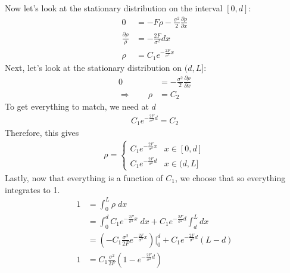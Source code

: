 \documentclass[12pt]{article}
\theoremstyle{plain}
\theoremstyle{definition}
\theoremstyle{remark}
\begin{document}
\begin{enumerate}
\begin{enumerate}
        Now let's look at the stationary distribution on the interval
        $[0,d]$:
        \begin{align*}
          0 &= -F \rho - \frac{\sigma^2}{2} \frac{\partial \rho}{\partial x}\\
          \frac{\partial \rho}{\rho } &= -\frac{2F }{\sigma^2} dx \\
          \rho &= C_1e^{-\frac{2F }{\sigma^2} x}
        \end{align*}
        Next, let's look at the stationary distribution on $(d,L]$:
        \begin{align*}
          0 &= - \frac{\sigma^2}{2} \frac{\partial \rho}{\partial x}\\
          \Rightarrow
          \qquad
          \rho &= C_2
        \end{align*}
        To get everything to match, we need at $d$
        \begin{align*}
          C_1e^{-\frac{2F }{\sigma^2} d} = C_2
        \end{align*}
        Therefore, this gives
        \begin{align*}
          \rho =
          \begin{cases}
            C_1e^{-\frac{2F }{\sigma^2} x} & x\in[0,d] \\
            C_1e^{-\frac{2F}{\sigma^2}d} & x\in(d,L]
          \end{cases}
        \end{align*}
        Lastly, now that everything is a function of $C_1$, we choose
        that so everything integrates to 1.
        \begin{align*}
          1 &= \int_0^L \rho\; dx\\
          &= \int_0^d C_1e^{-\frac{2F }{\sigma^2} x}\;dx
          + C_1e^{-\frac{2F}{\sigma^2}d}\int^L_d  dx\\
          &= \left(-C_1\frac{\sigma^2}{2F}e^{-\frac{2F}{\sigma^2} x}\right)\big|_0^d
          + C_1e^{-\frac{2F}{\sigma^2}d}(L-d)\\
          1 &= C_1\frac{\sigma^2}{2F}\left(1-e^{-\frac{2F}{\sigma^2} d}\right)

\end{align*}
\end{enumerate}
\end{enumerate}
\end{document}
